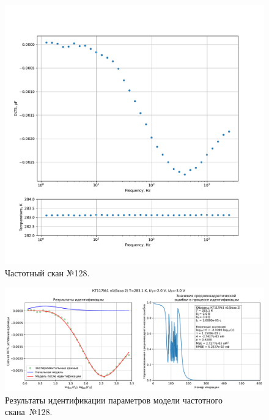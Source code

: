 \begin{figure}[!ht]
    \centering
    \includegraphics[width=1\textwidth]{../plots/КТ117№1_п1(база 2)_2500Гц-1Гц_1пФ_+10С_-2В-3В_50мВ_20мкс_шаг_0,1.pdf}
    \caption{Частотный скан №128.}
    \label{pic:frequency_scan_128}
\end{figure}

\begin{figure}[!ht]
    \centering
    \includegraphics[width=1\textwidth]{../plots/КТ117№1_п1(база 2)_2500Гц-1Гц_1пФ_+10С_-2В-3В_50мВ_20мкс_шаг_0,1_model.pdf}
    \caption{Результаты идентификации параметров модели частотного скана~№128.}
    \label{pic:frequency_scan_model128}
\end{figure}

\pagebreak


